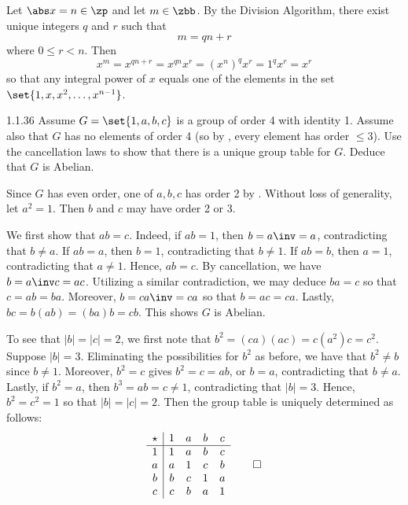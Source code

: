 \begin{sol}
    Let $\abs x = n \in \zp$ and let $m \in \zbb$.
	By the Division Algorithm, there exist unique integers $q$ and $r$ such that
    \[
    	m = qn + r
    \]
    where $0 \leq r < n$.
	Then
    \[
    	x^m = x^{qn + r} = x^{qn} x^r = (x^n)^q x^r = 1^q x^r = x^r
    \]
    so that any integral power of $x$ equals one of the elements in the set $\set{1, x, x^2, \dots, x^{n-1}}$.
\end{sol}

\begin{spex}{1.1.36}
    Assume $G = \set{1, a, b, c}$ is a group of order 4 with identity 1.
	Assume also that $G$ has no elements of order 4 (so by , every element has order $\leq 3$).
	Use the cancellation laws to show that there is a unique group table for $G$.
	Deduce that $G$ is Abelian.
\end{spex}

\begin{sol}[spsol]
    Since $G$ has even order, one of $a, b, c$ has order 2 by .
	Without loss of generality, let $a^2 = 1$.
	Then $b$ and $c$ may have order 2 or 3.

    We first show that $ab = c$.
	Indeed, if $ab = 1$, then $b = a\inv = a$, contradicting that $b \neq a$.
	If $ab = a$, then $b = 1$, contradicting that $b \neq 1$.
	If $ab = b$, then $a = 1$, contradicting that $a \neq 1$.
	Hence, $ab = c$.
	By cancellation, we have $b = a\inv c = ac$.
	Utilizing a similar contradiction, we may deduce $ba = c$ so that $c = ab = ba$.
	Moreover, $b = ca\inv = ca$ so that $b = ac = ca$.
	Lastly, $bc = b(ab) = (ba)b = cb$.
	This shows $G$ is Abelian.

    To see that $|b| = |c| = 2$, we first note that $b^2 = (ca)(ac) = c(a^2)c = c^2$.
	Suppose $|b| = 3$.
	Eliminating the possibilities for $b^2$ as before, we have that $b^2 \neq b$ since $b \neq 1$.
	Moreover, $b^2 = c$ gives $b^2 = c = ab$, or $b = a$, contradicting that $b \neq a$.
	Lastly, if $b^2 = a$, then $b^3 = ab = c \neq 1$, contradicting that $|b| = 3$.
	Hence, $b^2 = c^2 = 1$ so that $|b| = |c| = 2$.
	Then the group table is uniquely determined as follows:
    \[
        \begin{array}{c|cccc}
            \star & 1 & a & b & c \\
            \hline
            1 & 1 & a & b & c \\
            a & a & 1 & c & b \\
            b & b & c & 1 & a \\
            c & c & b & a & 1 \\
        \end{array} \qedhere
    \]
\end{sol}